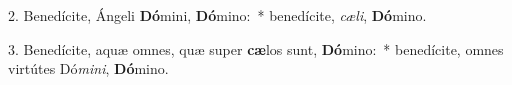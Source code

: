 
2. Benedícite, Ángeli \textbf{Dó}mini, \textbf{Dó}mino:~* benedícite, \textit{cæ}\textit{li}, \textbf{Dó}mino.

3. Benedícite, aquæ omnes, quæ super \textbf{cæ}los sunt, \textbf{Dó}mino:~* benedícite, omnes virtútes Dó\textit{mi}\textit{ni}, \textbf{Dó}mino.

